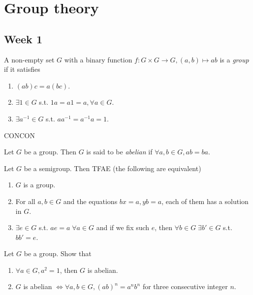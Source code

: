 \section{Group theory}

\subsection{Week 1}

\begin{definition}
  A non-empty set $G$ with a binary function $f: G \times G \to G,
  (a, b) \mapsto ab$
  is a {\it group} if it satisfies
  \begin{enumerate}
    \item $(ab)c = a(bc)$.
    \item $\exists 1 \in G$ s.t. $1a = a1 = a, \forall a \in G$.
    \item $\exists a^{-1} \in G$ s.t. $aa^{-1} = a^{-1}a = 1$.
  \end{enumerate}
\end{definition}

CONCON

\begin{definition}
  Let $G$ be a group. Then $G$ is said to be {\it abelian} if
  $\forall a, b \in G, ab = ba$.
\end{definition}

\begin{exercise}
  Let $G$ be a semigroup. Then TFAE (the following are equivalent)
  \begin{enumerate}
    \item $G$ is a group.
    \item For all $a, b \in G$ and the equations $bx=a, yb=a$, each of them
      has a solution in $G$.
    \item $\exists e \in G$ s.t. $ae=a \; \forall a \in G$ and if we fix
      such $e$, then $\forall b \in G \; \exists b' \in G$ s.t. $bb' = e$.
  \end{enumerate}
\end{exercise}

\begin{exercise}
  Let $G$ be a group. Show that
  \begin{enumerate}
    \item $\forall a \in G, a^2 = 1$, then $G$ is abelian.
    \item $G$ is abelian $\iff \forall a, b \in G, (ab)^n = a^n b^n$ for three
      consecutive integer $n$.
  \end{enumerate}
\end{exercise}

